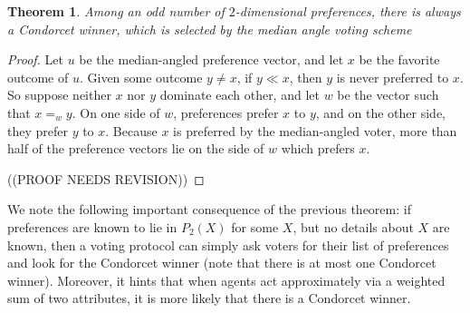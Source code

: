 \documentclass[12pt]{article}
\newtheorem{theorem}{Theorem}
\newcommand{\1}[1]{\mathds{1}[{#1}]}
\begin{document}
  \begin{theorem}
    Among an odd number of $2$-dimensional preferences,
    there is always a Condorcet winner, which is selected
    by the median angle voting scheme
  \end{theorem}
  \begin{proof}
    Let $u$ be the median-angled preference vector, and let
    $x$ be the favorite outcome of $u$.
    Given some outcome $y\ne x$, if $y \ll x$, then
    $y$ is never preferred to $x$.
    So suppose neither $x$ nor $y$ dominate each other, and let
    $w$ be the vector such that $x =_w y$.
    On one side of $w$, preferences prefer $x$ to $y$,
    and on the other side, they prefer $y$ to $x$.
    Because $x$ is preferred by the median-angled voter,
    more than half of the preference vectors lie on the side of $w$
    which prefers $x$.

    ((PROOF NEEDS REVISION))
  \end{proof}

  We note the following important consequence of the previous theorem:
  if preferences are known to lie in $P_2(X)$ for some $X$,
  but no details about $X$ are known, then a voting protocol can simply
  ask voters for their list of preferences and look for the Condorcet
  winner (note that there is at most one Condorcet winner).
  Moreover, it hints that when agents act approximately via a weighted
  sum of two attributes, it is more likely that there is a Condorcet winner.
\end{document}
